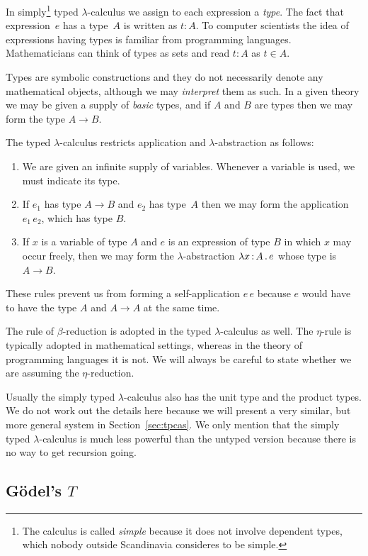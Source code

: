 \label{sec:simply-typed-lambda-calculus}

In simply\footnote{The calculus is called \emph{simple} because it
  does not involve dependent types, which nobody outside Scandinavia
  consideres to be simple.} typed $\lambda$-calculus we assign to each
expression a \emph{type}. The fact that expression~$e$ has a type~$A$
is written as $t : A$. To computer scientists the idea of expressions
having types is familiar from programming languages. Mathematicians
can think of types as sets and read $t : A$ as $t \in A$.

Types are symbolic constructions and they do not necessarily denote
any mathematical objects, although we may \emph{interpret} them as
such. In a given theory we may be given a supply of \emph{basic}
types, and if $A$ and $B$ are types then we may form the type $A \to
B$.

The typed $\lambda$-calculus restricts application and
$\lambda$-abstraction as follows:
%
\begin{enumerate}
\item We are given an infinite supply of variables. Whenever a
  variable is used, we must indicate its type.
\item If $e_1$ has type $A \to B$ and $e_2$ has type~$A$ then we may
  form the application $e_1 \, e_2$, which has type $B$.
\item If $x$ is a variable of type $A$ and $e$ is an expression of
  type $B$ in which $x$ may occur freely, then we may form the
  $\lambda$-abstraction $\lambda x \,{:}\, A\,.\,e$ whose type is $A \to B$.
\end{enumerate}
%
These rules prevent us from forming a self-application $e\, e$ because
$e$ would have to have the type $A$ and $A \to A$ at the same time.

The rule of $\beta$-reduction is adopted in the typed
$\lambda$-calculus as well. The $\eta$-rule is typically adopted in
mathematical settings, whereas in the theory of programming languages
it is not. We will always be careful to state whether we are assuming
the $\eta$-reduction.

Usually the simply typed $\lambda$-calculus also has the unit type and
the product types. We do not work out the details here because we will
present a very similar, but more general system in
Section~\ref{sec:tpcas}. We only mention that the simply typed
$\lambda$-calculus is much less powerful than the untyped version
because there is no way to get recursion going.

\subsection{G\"odel's $T$}

